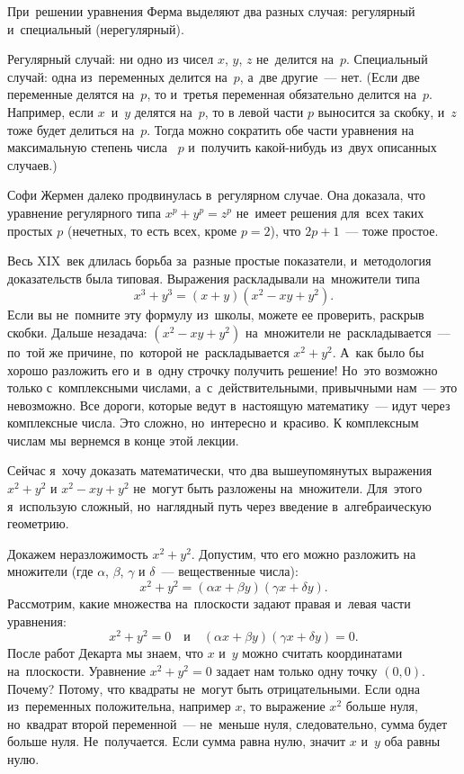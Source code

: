 При~решении уравнения Ферма выделяют два разных случая: регулярный и~специальный (нерегулярный).

Регулярный случай: ни одно из чисел $x$, $y$, $z$ не~делится на~$p$. Специальный случай: одна из~переменных делится
на~$p$, а~две другие~--- нет. (Если две переменные делятся на~$p$, то и~третья переменная обязательно
делится на~$p$. Например, если $x$~и~$y$ делятся на~$p$, то в левой части $p$ выносится за скобку, и~$z$ тоже будет делиться на~$p$.
Тогда можно сократить обе части уравнения на максимальную степень числа ~$p$ и~получить какой-нибудь из~двух описанных случаев.)

Софи Жермен далеко продвинулась в~регулярном случае. Она доказала, что уравнение регулярного типа
$x^{p}+y^{p}=z^{p}$ не~имеет решения для~всех таких простых $p$ (нечетных, то есть всех, кроме ${p=2}$), что $2p+1$~--- тоже простое.


Весь XIX~век длилась борьба за~разные простые показатели, и~методология доказательств была типовая.
Выражения раскладывали на~множители типа
$$
x^{3}+y^{3}=(x+y)(x^{2}-xy+y^{2}).
$$
Если вы не~помните эту формулу из~школы, можете ее проверить, раскрыв скобки. Дальше незадача:
$(x^{2}-xy+y^{2})$ на~множители не~раскладывается~--- по~той же причине, по~которой не~раскладывается
$x^{2}+y^{2}$. А~как было бы хорошо разложить его и~в~одну строчку получить решение! Но~это возможно только
с~комплексными числами, а~с~действительными, привычными нам~--- это невозможно. Все дороги, которые
ведут в~настоящую математику~--- идут через комплексные числа. Это сложно, но~интересно и~красиво. К комплексным числам мы вернемся в конце этой лекции.

Сейчас я~хочу доказать математически, что два вышеупомянутых выражения $x^{2}+y^{2}$ и $x^{2}-xy+y^{2}$ не~могут
быть разложены на~множители. Для~этого я~использую сложный, но~наглядный путь через введение
в~алгебраическую геометрию.

Докажем неразложимость $x^{2}+y^{2}$. Допустим, что его можно разложить на множители
(где $\alpha$, $\beta$, $\gamma$ и $\delta$~--- вещественные числа):
$$
x^{2}+y^{2}=
(\alpha x+\beta y)(\gamma x+\delta y).
$$
Рассмотрим, какие множества на~плоскости задают правая и~левая части уравнения:
$$
x^{2}+y^{2}=0\quad
\text{и}\quad
(\alpha x+\beta y)(\gamma x+\delta y)=0.
$$
После работ Декарта мы знаем, что $x$ и~$y$ можно считать координатами на~плоскости. Уравнение
$x^{2}+y^{2}=0$ задает нам только одну точку $(0,0)$. Почему? Потому, что квадраты не~могут быть
отрицательными. Если одна из~переменных положительна, например $x$, то выражение $x^2$ больше нуля, но~квадрат второй
переменной~--- не~меньше нуля, следовательно, сумма будет больше нуля.
 Не~получается. Если сумма
равна нулю, значит $x$ и~$y$ оба равны нулю.

